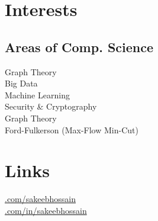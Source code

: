 \documentclass[]{deedy-resume-openfont}
\begin{document}
\begin{minipage}[t]{0.33\textwidth}
\section{Interests}
\subsection{Areas of Comp. Science}
Graph Theory \\
Big Data\\
Machine Learning \\
Security \& Cryptography \\
Graph Theory \\
Ford-Fulkerson (Max-Flow Min-Cut)
\sectionsep



\section{Links} 
\href{https://github.com/sakeebhossain}{.com/sakeebhossain} \\
\href{https://www.linkedin.com/in/sakeebhossain}{.com/in/sakeebhossain} \\
\sectionsep


%
%

\end{minipage} 
\hfill
\end{document}
